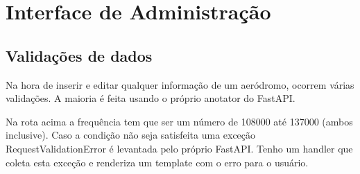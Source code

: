 \chapter{Interface de Administração}

\section{Validações de dados}
Na hora de inserir e editar qualquer informação de um aeródromo, ocorrem várias
validações. A maioria é feita usando o próprio anotator do FastAPI.



Na rota acima a frequência tem que ser um número de 108000 até 137000 (ambos
inclusive). Caso a condição não seja satisfeita uma exceção RequestValidationError
é levantada pelo próprio FastAPI. Tenho um handler que coleta esta exceção e
renderiza um template com o erro para o usuário.



